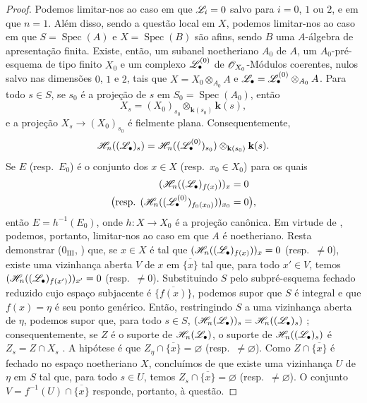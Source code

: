 \begin{proof}
\label{IV.9.9.6-proof}
Podemos limitar-nos ao caso em que $\mathscr{L}_i=0$ salvo para $i=0$, $1$ ou $2$, e em que $n=1$.
Além disso, sendo a questão local em $X$, podemos limitar-nos ao caso em que $S=\operatorname{Spec}(A)$ e $X=\operatorname{Spec}(B)$ são afins, sendo $B$ uma $A$-álgebra de apresentação finita.
Existe, então, um subanel noetheriano $A_0$ de $A$, um $A_0$-pré-esquema de tipo finito $X_0$ e um complexo $\mathscr{L}_\bullet^{(0)}$ de $\mathscr{O}_{X_0}$-Módulos coerentes, nulos salvo nas dimensões $0$, $1$ e $2$, tais que $X=X_0\otimes_{A_0}A$ e $\mathscr{L}_\bullet=\mathscr{L}_\bullet^{(0)}\otimes_{A_0}A$.
Para todo $s\in S$, se $s_0$ é a projeção de $s$ em $S_0=\operatorname{Spec}(A_0)$, então
\[
  X_s=(X_0)_{s_0}\otimes_{\mathbf{k}(s_0)}\mathbf{k}(s),
\]
e a projeção $X_s\to(X_0)_{s_0}$ é fielmente plana.
Consequentemente,
\[
  \mathscr{H}_n((\mathscr{L}_\bullet)_s)
  =\mathscr{H}_n((\mathscr{L}_\bullet^{(0)})_{s_0})\otimes_{\mathbf{k}(s_0)}\mathbf{k}(s).
\]
Se $E$ (resp.~$E_0$) é o conjunto dos $x\in X$ (resp.~$x_0\in X_0$) para os quais
\[
  \begin{aligned}
  (\mathscr{H}_n((\mathscr{L}_\bullet)_{f(x)}))_x&=0\\
  \bigl(\text{resp. }(\mathscr{H}_n((\mathscr{L}_\bullet^{(0)})_{f_0(x_0)}))_{x_0}&=0\bigr),
  \end{aligned}
\]
então $E=h^{-1}(E_0)$, onde $h:X\to X_0$ é a projeção canônica.
Em virtude de , podemos, portanto, limitar-nos ao caso em que $A$ é noetheriano.
Resta demonstrar ($0_{\mathrm{III}}$, ) que, se $x\in X$ é tal que $(\mathscr{H}_n((\mathscr{L}_\bullet)_{f(x)}))_x=0$ (resp.~$\neq 0$), existe uma vizinhança aberta $V$ de $x$ em $\overline{\{x\}}$ tal que, para todo $x'\in V$, temos $(\mathscr{H}_n((\mathscr{L}_\bullet)_{f(x')}))_{x'}=0$ (resp.~$\neq 0$).
Substituindo $S$ pelo subpré-esquema fechado reduzido cujo espaço subjacente é $\overline{\{f(x)\}}$, podemos supor que $S$ é integral e que $f(x)=\eta$ é seu ponto genérico.
Então, restringindo $S$ a uma vizinhança aberta de $\eta$, podemos supor que, para todo $s\in S$,
$(\mathscr{H}_n(\mathscr{L}_\bullet))_s=\mathscr{H}_n((\mathscr{L}_\bullet)_s)$ ; consequentemente, se $Z$ é o suporte de $\mathscr{H}_n(\mathscr{L}_\bullet)$, o suporte de $\mathscr{H}_n((\mathscr{L}_\bullet)_s)$ é $Z_s=Z\cap X_s$ .
A hipótese é que $Z_\eta\cap\overline{\{x\}}=\varnothing$ (resp.~$\neq\varnothing$).
Como $Z\cap\overline{\{x\}}$ é fechado no espaço noetheriano $X$, concluímos de  que existe uma vizinhança $U$ de $\eta$ em $S$ tal que, para todo $s\in U$, temos $Z_s\cap\overline{\{x\}}=\varnothing$ (resp.~$\neq\varnothing$).
O conjunto $V=f^{-1}(U)\cap\overline{\{x\}}$ responde, portanto, à questão.
\end{proof}
